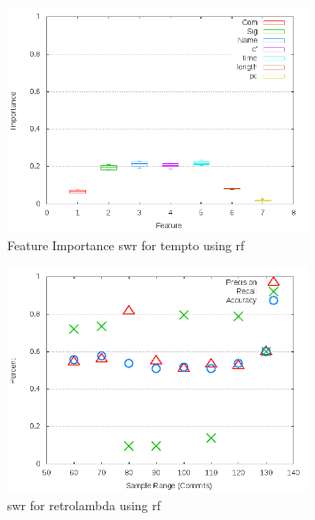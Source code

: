 \begin{figure}[!t]
\centering
\includegraphics[width=0.8\textwidth]{images/rf/test_1/tempto_importance.png}
\caption{Feature Importance \gls{swr} for tempto using \gls{rf}}
\label{fig:test_1_tempto_rf_importance}
\end{figure}

\begin{figure}[!t]
\centering
\includegraphics[width=0.8\textwidth]{images/rf/test_1/retrolambda_sample_range.png}
\caption{\gls{swr} for retrolambda using \gls{rf}}
\label{fig:test_1_retrolambda_rf}
\end{figure}

